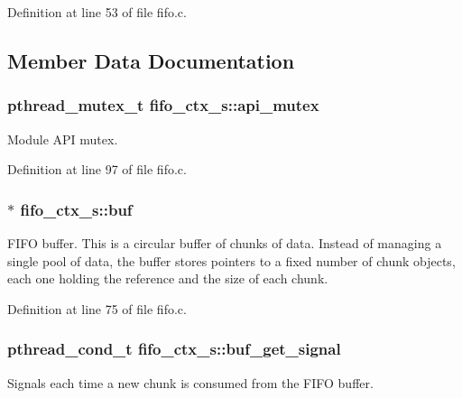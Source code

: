 Definition at line 53 of file fifo.\+c.



\subsection{Member Data Documentation}
\subsubsection[{\texorpdfstring{api\+\_\+mutex}{api_mutex}}]{\setlength{\rightskip}{0pt plus 5cm}pthread\+\_\+mutex\+\_\+t fifo\+\_\+ctx\+\_\+s\+::api\+\_\+mutex}\hypertarget{structfifo__ctx__s_a27be272ae3fa045dfb5e64778a484725}{}\label{structfifo__ctx__s_a27be272ae3fa045dfb5e64778a484725}
Module A\+PI mutex. 

Definition at line 97 of file fifo.\+c.

\subsubsection[{\texorpdfstring{buf}{buf}}]{$\ast$ fifo\+\_\+ctx\+\_\+s\+::buf}\hypertarget{structfifo__ctx__s_a282d9421deabfcb2966d5134a6d76779}{}\label{structfifo__ctx__s_a282d9421deabfcb2966d5134a6d76779}
F\+I\+FO buffer. This is a circular buffer of chunks of data. Instead of managing a single pool of data, the buffer stores pointers to a fixed number of chunk objects, each one holding the reference and the size of each chunk. 

Definition at line 75 of file fifo.\+c.

\subsubsection[{\texorpdfstring{buf\+\_\+get\+\_\+signal}{buf_get_signal}}]{\setlength{\rightskip}{0pt plus 5cm}pthread\+\_\+cond\+\_\+t fifo\+\_\+ctx\+\_\+s\+::buf\+\_\+get\+\_\+signal}\hypertarget{structfifo__ctx__s_af13501e5f83d5d1561bf76577c490f23}{}\label{structfifo__ctx__s_af13501e5f83d5d1561bf76577c490f23}
Signals each time a new chunk is consumed from the F\+I\+FO buffer. 

